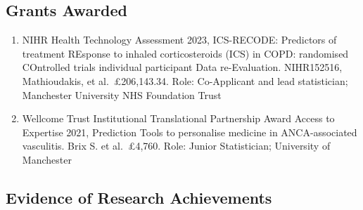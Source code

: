\documentclass[
]{article}
\providecommand{\tightlist}{%
  \setlength{\itemsep}{0pt}\setlength{\parskip}{0pt}}
\begin{document}
\hypertarget{grants-awarded}{%
\subsection{Grants Awarded}\label{grants-awarded}}

\begin{enumerate}
\def\labelenumi{\arabic{enumi}.}
\tightlist
\item
  NIHR Health Technology Assessment 2023, ICS-RECODE: Predictors of
  treatment REsponse to inhaled corticosteroids (ICS) in COPD:
  randomised COntrolled trials individual participant Data
  re-Evaluation. NIHR152516, Mathioudakis, et al.~£206,143.34. Role:
  Co-Applicant and lead statistician; Manchester University NHS
  Foundation Trust
\item
  Wellcome Trust Institutional Translational Partnership Award Access to
  Expertise 2021, Prediction Tools to personalise medicine in
  ANCA-associated vasculitis. Brix S. et al.~£4,760. Role: Junior
  Statistician; University of Manchester
\end{enumerate}

\hypertarget{evidence-of-research-achievements}{%
\subsection{Evidence of Research
Achievements}\label{evidence-of-research-achievements}}
\end{document}
